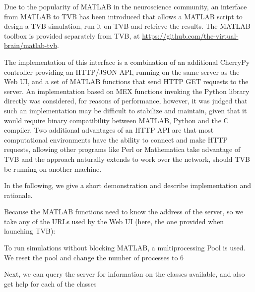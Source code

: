

Due to the popularity of MATLAB in the neuroscience community, an
interface from MATLAB to TVB has been introduced that allows a MATLAB
script to design a TVB simulation, run it on TVB and retrieve the 
results. The MATLAB toolbox is provided separately from TVB, at
\url{https://github.com/the-virtual-brain/matlab-tvb}.

The implementation of this interface is a combination of an additional
CherryPy controller providing an HTTP/JSON API, running on the same 
server as the Web UI, and a set of MATLAB functions that send HTTP 
GET requests to the server. An implementation based on MEX functions 
invoking the Python library directly was considered, for reasons of 
performance, however, it was judged that such an implementation may be
difficult to stabilize and maintain, given that it would require binary
compatibility between MATLAB, Python and the C compiler. Two additional 
advantages of an HTTP API are that most computational environments have
the ability to connect and make HTTP requests, allowing other programs 
like Perl or Mathematica take advantage of TVB and the approach naturally
extends to work over the network, should TVB be running on another machine.

In the following, we give a short demonstration and 
describe implementation and rationale.



Because the MATLAB functions need to know the address of the server,
so we take any of the URLs used by the Web UI (here, the one provided
when launching TVB):


To run simulations without blocking MATLAB, a multiprocessing Pool
is used. We reset the pool and change the number of processes to 6


Next, we can query the server for information on the classes available,
and also get help for each of the classes


